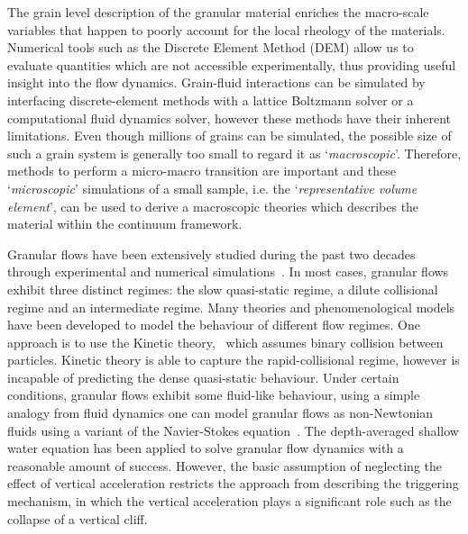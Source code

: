 The grain level description of the granular material enriches the 
macro-scale variables that happen to poorly account for the local rheology of 
the materials. Numerical tools such as the Discrete Element Method (DEM) 
allow us to evaluate quantities which are not accessible experimentally, thus 
providing useful insight into the flow dynamics. Grain-fluid interactions can 
be simulated by interfacing discrete-element methods with a lattice 
Boltzmann solver or a computational fluid dynamics solver, however these 
methods have their inherent limitations. Even though millions of grains can be 
simulated, the possible size of such a grain system is generally too small 
to regard it as `\textit{macroscopic}'. Therefore, methods to perform a 
micro-macro transition are important and these `\textit{microscopic}' 
simulations of a small sample, i.e. the `\textit{representative volume 
element}', can be used to derive a macroscopic theories which describes the 
material within the continuum framework. 

Granular flows have been extensively studied during the past two decades 
through experimental and numerical 
simulations~\citep{Jaeger1996,Iverson1997a,Denlinger2001,Tang2013,Andersen2010}.
In most cases, granular flows exhibit three distinct regimes: the slow 
quasi-static regime, a dilute collisional regime and an intermediate regime. 
Many theories and phenomenological models have been developed to model the 
behaviour of different flow regimes. One approach is to use the Kinetic 
theory,~\citep{Jenkins1983, Savage1981} which assumes binary collision between 
particles. Kinetic theory is able to capture the rapid-collisional regime, 
however is incapable of predicting the dense quasi-static behaviour. Under 
certain conditions, granular 
flows exhibit some fluid-like behaviour, using a simple analogy from fluid 
dynamics one can model granular flows as non-Newtonian fluids using a variant 
of the Navier-Stokes equation~\citep{Savage1991}. The depth-averaged shallow 
water equation has been applied to solve 
granular flow dynamics with a reasonable amount of success. However, the basic 
assumption of neglecting the effect of vertical acceleration restricts the 
approach from describing the triggering mechanism, in which the vertical 
acceleration plays a significant role such as the collapse of a vertical cliff.

